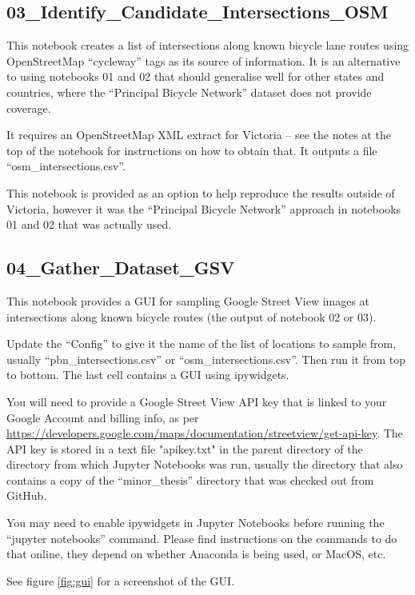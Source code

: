 \documentclass[11pt,twoside]{report}
\begin{document}
\subsection{03\_Identify\_Candidate\_Intersections\_OSM}
\label{aj03}

This notebook creates a list of intersections along known bicycle lane routes using OpenStreetMap ``cycleway'' tags as its source of information.  It is an alternative to using notebooks 01 and 02 that should generalise well for other states and countries, where the ``Principal Bicycle Network'' dataset does not provide coverage.

It requires an OpenStreetMap XML extract for Victoria -- see the notes at the top of the notebook for instructions on how to obtain that.   It outputs a file ``osm\_intersections.csv''.

This notebook is provided as an option to help reproduce the results outside of Victoria, however it was the ``Principal Bicycle Network'' approach in notebooks 01 and 02 that was actually used.

\subsection{04\_Gather\_Dataset\_GSV}
\label{aj04}

This notebook provides a GUI for sampling Google Street View images at intersections along known bicycle routes (the output of notebook 02 or 03).

Update the ``Config'' to give it the name of the list of locations to sample from, usually ``pbn\_intersections.csv'' or ``osm\_intersections.csv''.  Then run it from top to bottom.  The last cell contains a GUI using ipywidgets.

You will need to provide a Google Street View API key that is linked to your Google Account and billing info, as per \url{https://developers.google.com/maps/documentation/streetview/get-api-key}.  The API key is stored in a text file "apikey.txt" in the parent directory of the directory from which Jupyter Notebooks was run, usually the directory that also contains a copy of the ``minor\_thesis'' directory that was checked out from GitHub.

You may need to enable ipywidgets in Jupyter Notebooks before running the ``jupyter notebooks'' command.  Please find instructions on the commands to do that online, they depend on whether Anaconda is being used, or MacOS, etc.

See figure \ref{fig:gui} for a screenshot of the GUI.
\end{document}
